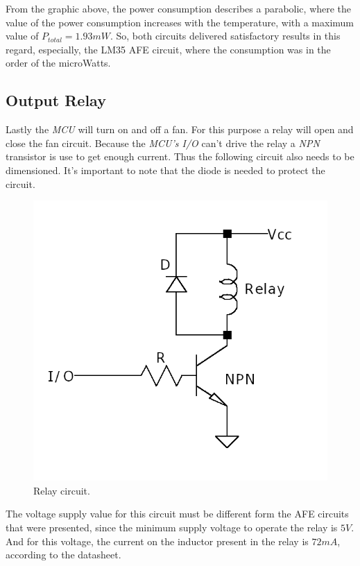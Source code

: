 \documentclass[12pt]{article}
\begin{document}
    From the graphic above, the power consumption describes a parabolic, where the value of the power consumption increases with the 
    temperature, with a maximum value of $P_{total} = 1.93 mW$. So, both circuits delivered satisfactory results in this regard, 
    especially, the LM35 AFE circuit, where the consumption was in the order of the microWatts.
\subsection{Output Relay }
    
    Lastly the \textit{MCU} will turn on and off a fan. For this purpose 
    a relay will open and close the fan circuit. Because the \textit{MCU's I/O} 
    can't drive the relay a \textit{NPN} transistor is use to get enough current.
    Thus the following circuit also needs to be dimensioned. It's important to note
    that the diode is needed to protect the circuit.
    
    \begin{figure}[H] 
        \centering
        \includegraphics*[scale = 0.4]{images/RelayDrive.png}
        \caption{Relay circuit.}
        \label{relaycircuit}
    \end{figure}

    The voltage supply value for this circuit must be different form the AFE circuits that were presented,
    since the minimum supply voltage to operate the relay is $5V$. And for this voltage, the 
    current on the inductor present in the relay is $72mA$, according to the datasheet.
    
\end{document}
